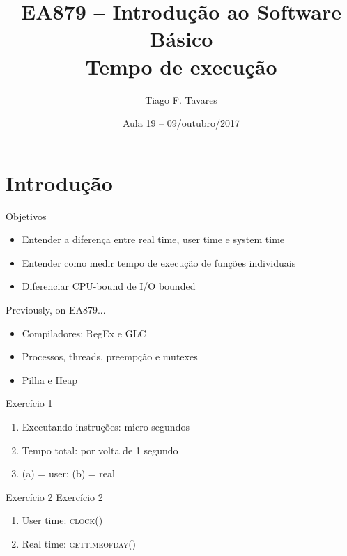 \documentclass{beamer}
\title[19-Tempo]{EA879 -- Introdução ao Software
Básico\\Tempo de execução}
\author{Tiago F. Tavares}
\institute{FEEC -- UNICAMP}
\date{Aula 19 -- 09/outubro/2017}
\begin{document}
\begin{frame}
  \titlepage
\end{frame}


\section{Introdução}

\begin{frame}{Objetivos}
  \Large
  \begin{itemize}
    \item Entender a diferença entre real time, user time e system time
    \item Entender como medir tempo de execução de funções individuais
    \item Diferenciar CPU-bound de I/O bounded
  \end{itemize}
\end{frame}

\begin{frame}[fragile]{Previously, on EA879...}
  \centering
  \Large
  \begin{itemize}
    \item Compiladores: RegEx e GLC
    \item Processos, threads, preempção e mutexes
    \item Pilha e Heap
  \end{itemize}
\end{frame}

\begin{frame}[fragile]{Exercício 1}
  \centering
  \Large
  \begin{enumerate}
    \item <2-> Executando instruções: micro-segundos
    \item <3-> Tempo total: por volta de 1 segundo
    \item <4-> (a) = user; (b) = real
  \end{enumerate}
\end{frame}

\begin{frame}[fragile]{Exercício 2}
  \centering
  \Large
  Exercício 2
  \begin{enumerate}
    \item <2-> User time: \textsc{clock()}
    \item <3-> Real time: \textsc{gettimeofday()}
  \end{enumerate}
\end{frame}
\end{document}
